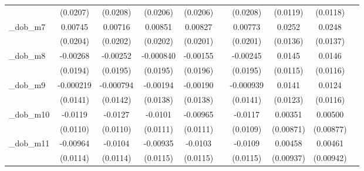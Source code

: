 \begin{table}[htbp]
\begin{tabular}{l*{9}{c}}
            &    (0.0207)         &    (0.0208)         &    (0.0206)         &    (0.0206)         &                     &    (0.0208)         &    (0.0119)         &    (0.0118)         &                     \\
[1em]
\_dob\_m7     &     0.00745         &     0.00716         &     0.00851         &     0.00827         &                     &     0.00773         &      0.0252\sym{*}  &      0.0248\sym{*}  &                     \\
            &    (0.0204)         &    (0.0202)         &    (0.0202)         &    (0.0201)         &                     &    (0.0201)         &    (0.0136)         &    (0.0137)         &                     \\
[1em]
\_dob\_m8     &    -0.00268         &    -0.00252         &   -0.000840         &    -0.00155         &                     &    -0.00245         &      0.0145         &      0.0146         &                     \\
            &    (0.0194)         &    (0.0195)         &    (0.0195)         &    (0.0196)         &                     &    (0.0195)         &    (0.0115)         &    (0.0116)         &                     \\
[1em]
\_dob\_m9     &   -0.000219         &   -0.000794         &    -0.00194         &    -0.00190         &                     &   -0.000939         &      0.0141         &      0.0124         &                     \\
            &    (0.0141)         &    (0.0142)         &    (0.0138)         &    (0.0138)         &                     &    (0.0141)         &    (0.0123)         &    (0.0116)         &                     \\
[1em]
\_dob\_m10    &     -0.0119         &     -0.0127         &     -0.0101         &    -0.00965         &                     &     -0.0117         &     0.00351         &     0.00500         &                     \\
            &    (0.0110)         &    (0.0110)         &    (0.0111)         &    (0.0111)         &                     &    (0.0109)         &   (0.00871)         &   (0.00877)         &                     \\
[1em]
\_dob\_m11    &    -0.00964         &     -0.0104         &    -0.00935         &     -0.0103         &                     &     -0.0109         &     0.00458         &     0.00461         &                     \\
            &    (0.0114)         &    (0.0114)         &    (0.0115)         &    (0.0115)         &                     &    (0.0115)         &   (0.00937)         &   (0.00942)         &                     \\

\end{tabular}
\end{table}
